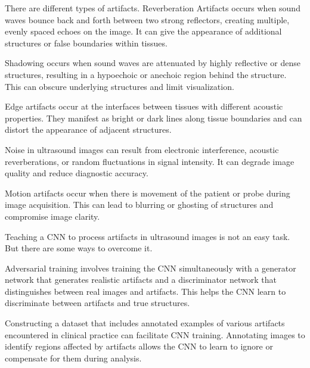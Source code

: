 \documentclass{article}
\begin{document}
\par There are different types of artifacts. Reverberation
Artifacts occurs when sound waves bounce back and
forth between two strong reflectors, creating multiple,
evenly spaced echoes on the image. It can give the
appearance of additional structures or false boundaries
within tissues.

\par Shadowing occurs when sound waves are attenuated
by highly reflective or dense structures, resulting in a
hypoechoic or anechoic region behind the structure. This
can obscure underlying structures and limit visualization.

\par Edge artifacts occur at the interfaces between tissues
with different acoustic properties. They manifest as bright
or dark lines along tissue boundaries and can distort the
appearance of adjacent structures.

\par Noise in ultrasound images can result from electronic
interference, acoustic reverberations, or random fluctuations in signal intensity. It can degrade image quality and
reduce diagnostic accuracy.

\par Motion artifacts occur when there is movement of the
patient or probe during image acquisition. This can lead
to blurring or ghosting of structures and compromise
image clarity.

\par Teaching a CNN to process artifacts in ultrasound
images is not an easy task. But there are some ways
to overcome it.

\par Adversarial training involves training the CNN simultaneously with a generator network that generates realistic
artifacts and a discriminator network that distinguishes
between real images and artifacts. This helps the CNN
learn to discriminate between artifacts and true structures.
\par Constructing a dataset that includes annotated examples of various
artifacts encountered in clinical practice
can facilitate CNN training. Annotating images to identify regions affected by artifacts allows the CNN to learn
to ignore or compensate for them during analysis.
\end{document}
